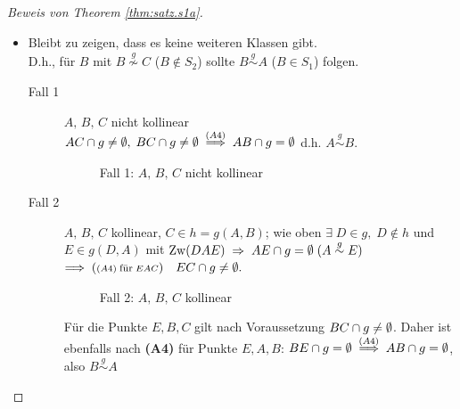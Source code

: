 \begin{proof}[Beweis von Theorem \ref{thm:satz.s1a}]
\begin{itemize}
        \item Bleibt zu zeigen, dass es keine weiteren Klassen gibt.\\
            D.h., für $B$ mit $B \stackrel{g}{\nsim} C$ ($B \notin S_2$) sollte $B
            \stackrel{g}{\sim} A$ ($B \in S_1$) folgen.


        \begin{description}
            \item[Fall 1] $A,\,B,\,C$ nicht kollinear\\
                ${AC} \cap g \neq \emptyset,\; {BC} \cap g \neq \emptyset\;
                \stackrel{(A4)}{\Longrightarrow}\; {AB} \cap g = \emptyset$ d.h. $A
                \stackrel{g}{\sim} B$.

                \begin{figure}[ht]
                    
                    \caption{Fall 1: $A,\,B,\,C$ nicht kollinear}
                \end{figure}

            \item[Fall 2] $A,\, B,\, C$ kollinear, $C \in h = g(A,B)$; wie oben $\exists\; D \in
                g,\; D \notin h$ und $E \in g(D,A)$ mit $\operatorname{Zw}(DAE)\; \Rightarrow\; {AE} \cap g =
                \emptyset\; (A \stackrel{g}{\sim} E)$\\ $\Longrightarrow\; ({\scriptstyle (A4)\;
                \mbox{\footnotesize für}\; EAC}) \quad {EC} \cap g \neq \emptyset.$

                \begin{figure}[ht]
                    
                    \caption{Fall 2: $A,\,B,\,C$ kollinear}
                \end{figure}

                Für die Punkte $E, B, C$ gilt nach Voraussetzung ${BC} \cap g \neq \emptyset$.
                Daher ist ebenfalls nach \textbf{(A4)} für Punkte $E, A, B$: ${BE} \cap g =
                \emptyset \; \stackrel{(A4)}{\Longrightarrow}\; {AB} \cap g = \emptyset$, also
                $B \stackrel{g}{\sim} A$
        \end{description}
    \end{itemize}
\end{proof}

